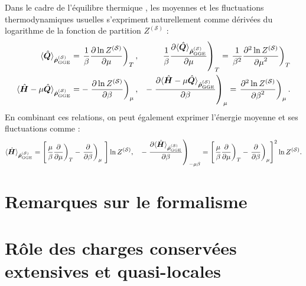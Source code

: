 Dans le cadre de l’équilibre thermique , les moyennes et les fluctuations thermodynamiques usuelles s’expriment naturellement comme dérivées du logarithme de la fonction de partition $Z^{(\mathcal{S})}$ :
\begin{eqnarray}
	\langle \hat{\bm{Q}} \rangle_{\hat{\bm{\rho}}^{(\mathcal{S})}_{\mathrm{GGE}}}  = \left .\frac{1}{\beta} \frac{ \partial \ln Z^{(\mathcal{S})}}{\partial \mu } \right )_{T},  & &  \left . \frac{1}{\beta} \frac{ \partial \langle \hat{\bm{Q}} \rangle_{\hat{\bm{\rho}}^{(\mathcal{S})}_{\mathrm{GGE}}}}{\partial \mu } \right )_{T} =  \left . \frac{1}{\beta^2} \frac{ \partial^2 \ln Z^{(\mathcal{S})}}{{\partial \mu}^2 } \right )_{T} \\
	\langle \hat{\bm{H}} - \mu\hat{\bm{Q}}  \rangle_{\hat{\bm{\rho}}^{(\mathcal{S})}_{\mathrm{GGE}}}  = -\left . \frac{ \partial \ln Z^{(\mathcal{S})}}{\partial \beta } \right )_{\mu} ,  & & -\left .  \frac{ \partial \langle \hat{\bm{H}} - \mu\hat{\bm{Q}} \rangle_{\hat{\bm{\rho}}^{(\mathcal{S})}_{\mathrm{GGE}}}}{\partial \beta } \right )_{\mu } = \left .  \frac{ \partial^2 \ln Z^{(\mathcal{S})}}{{\partial \beta}^2 } \right )_{\mu}   .		
\end{eqnarray}
En combinant ces relations, on peut également exprimer l’énergie moyenne et ses fluctuations comme :
\begin{eqnarray}
	\langle \operator{H} \rangle_{\operator{\rho}^{(\mathcal{S})}_{\mathrm{GGE}}}  = \left [ \left .\frac{\mu}{\beta} \frac{ \partial}{\partial \mu } \right )_{T} -\left . \frac{ \partial }{\partial \beta } \right )_{\mu}   \right ]\ln Z^{(\mathcal{S})},  \quad  -\left .  \frac{ \partial \langle \operator{H} \rangle_{\operator{\rho}^{(\mathcal{S})}_{\mathrm{GGE}}}}{\partial \beta } \right )_{-\mu \beta } = \left [ \left .\frac{\mu}{\beta} \frac{ \partial}{\partial \mu } \right )_{T} -\left . \frac{ \partial }{\partial \beta } \right )_{\mu}  \right ]^2\ln Z^{(\mathcal{S})}.		
\end{eqnarray}


\section{Remarques sur le formalisme}




%
\section{Rôle des charges conservées extensives et quasi-locales}

